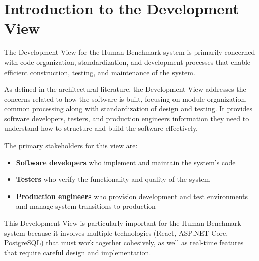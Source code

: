


% 



\section{Introduction to the Development View}

The Development View for the Human Benchmark system is primarily concerned with code organization, 
standardization, and development processes that enable efficient construction, testing, and maintenance of the system.

As defined in the architectural literature, the Development View addresses the concerns related to how the software is built, 
focusing on module organization, common processing along with standardization of design and testing. 
It provides software developers, testers, and production engineers information they need to understand how to structure and build the software effectively.

The primary stakeholders for this view are:
\begin{itemize}
    \item \textbf{Software developers} who implement and maintain the system's code
    \item \textbf{Testers} who verify the functionality and quality of the system
    \item \textbf{Production engineers} who provision development and test environments and manage system transitions to production
\end{itemize}

This Development View is particularly important for the Human Benchmark system because it involves multiple technologies (React, ASP.NET Core, PostgreSQL)
 that must work together cohesively, as well as real-time features that require careful design and implementation.

